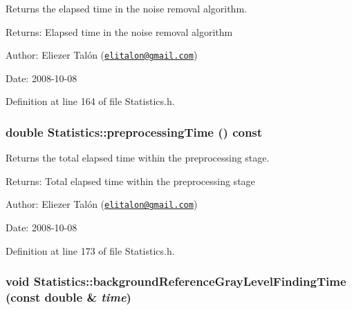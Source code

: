 Returns the elapsed time in the noise removal algorithm. 

\begin{Desc}
\item[Returns:]Elapsed time in the noise removal algorithm\end{Desc}
\begin{Desc}
\item[Author:]Eliezer Talón (\href{mailto:elitalon@gmail.com}{\tt elitalon@gmail.com}) \end{Desc}
\begin{Desc}
\item[Date:]2008-10-08 \end{Desc}


Definition at line 164 of file Statistics.h.\hypertarget{class_statistics_d88deb57349fedd7035ccffa06b4859b}{
\subsubsection[preprocessingTime]{\setlength{\rightskip}{0pt plus 5cm}double Statistics::preprocessingTime () const}}
\label{class_statistics_d88deb57349fedd7035ccffa06b4859b}


Returns the total elapsed time within the preprocessing stage. 

\begin{Desc}
\item[Returns:]Total elapsed time within the preprocessing stage\end{Desc}
\begin{Desc}
\item[Author:]Eliezer Talón (\href{mailto:elitalon@gmail.com}{\tt elitalon@gmail.com}) \end{Desc}
\begin{Desc}
\item[Date:]2008-10-08 \end{Desc}


Definition at line 173 of file Statistics.h.\hypertarget{class_statistics_f8a60e8a89be8fe8b2c46782681c1a2c}{
\subsubsection[backgroundReferenceGrayLevelFindingTime]{\setlength{\rightskip}{0pt plus 5cm}void Statistics::backgroundReferenceGrayLevelFindingTime (const double \& {\em time})}}
\label{class_statistics_f8a60e8a89be8fe8b2c46782681c1a2c}


